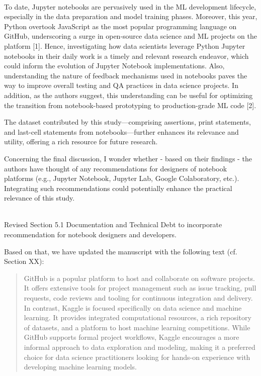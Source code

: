 \documentclass[11pt,fleqn]{article}
\newcommand{\eline}{\vspace*{.75\baselineskip}}
\newcommand{\Referee}[1]{\eline \noindent {\bf Reviewer comment #1:} \\}
\newcommand{\Us}{\eline \noindent {\bf Response:}\\}
\newenvironment{revcomment}[1][]
{\Referee{#1}\begin{rcomment}}
{\end{rcomment}}
\begin{document}
\begin{revcomment}[1.2]

To date, Jupyter notebooks are pervasively used in the ML development lifecycle, especially in the data preparation and model training phases. Moreover, this year, Python overtook JavaScript as the most popular programming language on GitHub, underscoring a surge in open-source data science and ML projects on the platform [1]. Hence, investigating how data scientists leverage Python Jupyter notebooks in their daily work is a timely and relevant research endeavor, which could inform the evolution of Jupyter Notebook implementations. Also, understanding the nature of feedback mechanisms used in notebooks paves the way to improve overall testing and QA practices in data science projects. In addition, as the authors suggest, this understanding can be useful for optimizing the transition from notebook-based prototyping to production-grade ML code [2].

The dataset contributed by this study—comprising assertions, print statements, and last-cell statements from notebooks—further enhances its relevance and utility, offering a rich resource for future research.

Concerning the final discussion, I wonder whether - based on their findings - the authors have thought of any recommendations for designers of notebook platforms (e.g., Jupyter Notebook, Jupyter Lab, Google Colaboratory, etc.). Integrating such recommendations could potentially enhance the practical relevance of this study.


\end{revcomment}

\Us Revised Section 5.1 Documentation and Technical Debt to incorporate recommendation for notebook designers and developers.

Based on that, we have updated the manuscript with the following text (cf. Section XX):

\begin{quote}
GitHub is a popular platform to host and collaborate on software projects. It offers extensive tools for project management such as issue tracking, pull requests, code reviews and tooling for continuous integration and delivery. In contrast, Kaggle is focused specifically on data science and machine learning. It provides integrated computational resources, a rich repository of datasets, and a platform to host machine learning competitions. While GitHub supports formal project workflows, Kaggle encourages a more informal approach to data exploration and modeling, making it a preferred choice for data science practitioners looking for hands-on experience with developing machine learning models.  
\end{quote}
\end{document}
